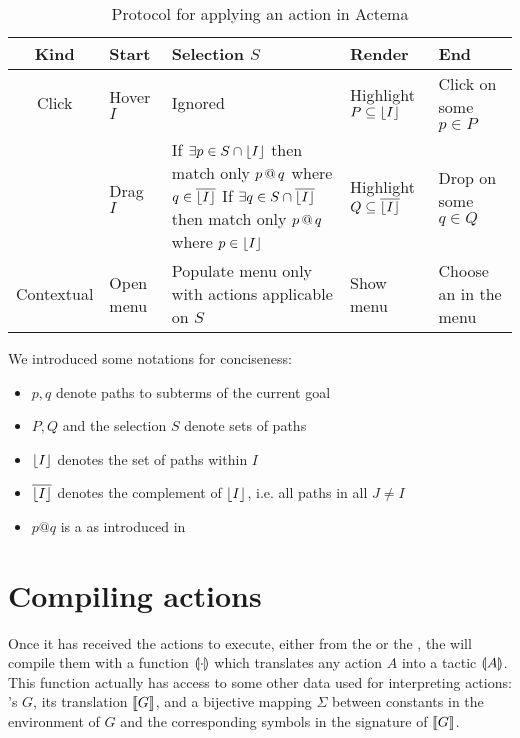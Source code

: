 \begin{table*}[]
  \def\arraystretch{1.5}
  \begin{tabular}{|c|C{0.2\textwidth}|C{0.4\textwidth}|C{0.25\textwidth}|C{0.2\textwidth}|}
  \hline
  \textbf{Kind} & \textbf{Start}       & \textbf{Selection $S$} &
  \textbf{Render}                      & \textbf{End} \\ \hline
  Click         & Hover  $I$       & Ignored & Highlight $P \subseteq
  \lfloor I \rfloor$ & Click on some $p \in P$    \\ \hline
             & Drag  $I$        &
      If $\exists p \in S \cap \lfloor I \rfloor$ then match only $p \operatorname{\mathrel{@}} q$ where
      $q \in \overline{\lfloor I \rfloor}$
      \newline
      If $\exists q \in S \cap \overline{\lfloor I \rfloor}$ then match only $p
      \operatorname{\mathrel{@}} q$ where $p \in \lfloor I \rfloor$
    & Highlight $Q \subseteq \overline{\lfloor I \rfloor}$ & Drop on some $q \in Q$ \\ \hline
  Contextual    & Open menu & Populate menu only with actions
  applicable on $S$ & Show menu & Choose an  in the menu \\ \hline
  \end{tabular}
  \raggedright
  \parbox{\textwidth}{
    \vspace{1.5em}
    We introduced some notations for conciseness:
    \begin{itemize}
      \item $p, q$ denote paths to subterms of the current goal
      \item $P, Q$ and the selection $S$ denote sets of paths
      \item $\lfloor I \rfloor$ denotes the set of paths within  $I$
      \item $\overline{\lfloor I \rfloor}$ denotes the complement of $\lfloor I \rfloor$, i.e.
      all paths in all  $J \not= I$
      \item $p @ q$ is a  as introduced in 
    \end{itemize}}

  \caption{Protocol for applying an action in Actema}
\end{table*}


\section{Compiling actions}

Once it has received the actions to execute, either from the 
or the , the  will compile them with a function
$\llparenthesis \cdot \rrparenthesis$ which translates any action $A$ into a  tactic
$\llparenthesis A \rrparenthesis$. This function actually has access to some other data used for
interpreting actions: 's  $G$, its  translation $\llbracket G \rrbracket$, and a
bijective mapping $\Sigma$ between  constants in the environment of $G$ and
the corresponding  symbols in the  signature of $\llbracket G \rrbracket$.

